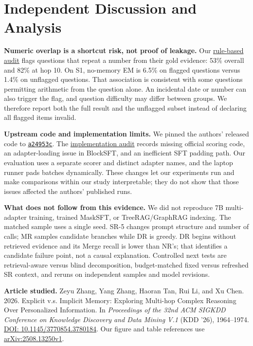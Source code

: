 \documentclass[sigconf,nonacm,10pt,balance=false]{acmart}
\newcommand{\baseurl}{https://github.com/xphiwork-dot/mpr-study/blob/main}
\newcommand{\repo}[2]{\href{\baseurl/#1}{#2}}
\newcommand{\emphlabel}[1]{\par\smallskip\noindent\textbf{#1}\enspace}
\newcommand{\cbox}[1]{\colorbox{softblue}{\parbox{\dimexpr\columnwidth-2\fboxsep\relax}{\small #1}}}
\begin{document}
\clearpage
\section{Independent Discussion and Analysis}
\emphlabel{Numeric overlap is a shortcut risk, not proof of leakage.} Our \repo{results/probes/leak_check.md}{rule-based audit} flags questions that repeat a number from their gold evidence: 53\% overall and 82\% at hop 10. On S1, no-memory EM is 6.5\% on flagged questions versus 1.4\% on unflagged questions. That association is consistent with some questions permitting arithmetic from the question alone. An incidental date or number can also trigger the flag, and question difficulty may differ between groups. We therefore report both the full result and the unflagged subset instead of declaring all flagged items invalid.

\emphlabel{Upstream code and implementation limits.} We pinned the authors' released code to \href{https://github.com/nuster1128/MPR/tree/a24953c}{\texttt{a24953c}}. The \repo{docs/upstream-notes.md}{implementation audit} records missing official scoring code, an adapter-loading issue in BlockSFT, and an inefficient SFT padding path. Our evaluation uses a separate scorer and distinct adapter names, and the laptop runner pads batches dynamically. These changes let our experiments run and make comparisons within our study interpretable; they do not show that those issues affected the authors' published runs.

\emphlabel{What does not follow from this evidence.} We did not reproduce 7B multi-adapter training, trained MaskSFT, or TreeRAG/GraphRAG indexing. The matched sample uses a single seed. SR-5 changes prompt structure and number of calls; MR samples candidate branches while DR is greedy. DR begins without retrieved evidence and its Merge recall is lower than NR's; that identifies a candidate failure point, not a causal explanation. Controlled next tests are retrieval-aware versus blind decomposition, budget-matched fixed versus refreshed SR context, and reruns on independent samples and model revisions.


\noindent\cbox{\textbf{Article studied.} Zeyu Zhang, Yang Zhang, Haoran Tan, Rui Li, and Xu Chen. 2026. Explicit v.s. Implicit Memory: Exploring Multi-hop Complex Reasoning Over Personalized Information. In \emph{Proceedings of the 32nd ACM \mbox{SIGKDD} Conference on Knowledge Discovery and Data Mining V.1} (KDD '26), 1964--1974. \href{https://doi.org/10.1145/3770854.3780184}{DOI: 10.1145/3770854.3780184}. Our figure and table references use \href{https://arxiv.org/html/2508.13250v1}{arXiv:2508.13250v1}.}
\end{document}
